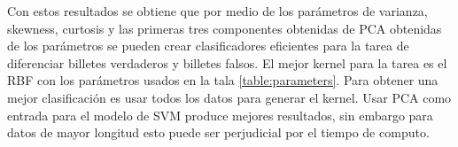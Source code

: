 Con estos resultados se obtiene que por medio de los parámetros de varianza, skewness, curtosis y las primeras tres componentes obtenidas de PCA obtenidas de los parámetros se pueden crear clasificadores eficientes para la tarea de diferenciar billetes verdaderos y billetes falsos. El mejor kernel para la tarea es el RBF con los parámetros usados en la tala \ref{table:parameters}. Para obtener una mejor clasificación es usar todos los datos para generar el kernel. Usar PCA como entrada para el modelo de SVM produce mejores resultados, sin embargo para datos de mayor longitud esto puede ser perjudicial por el tiempo de computo.

\pagebreak

\begin{figure}[H]
    \centering
    \caption{}
    \label{fig:svm_data}
\end{figure}

\pagebreak

\begin{figure}[H]
    \centering
    \caption{}
    \label{fig:svm_pca}
\end{figure}